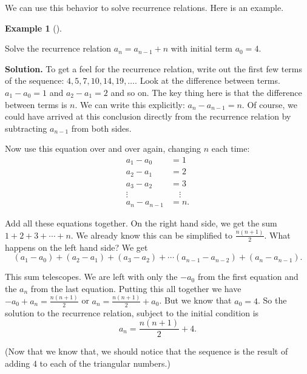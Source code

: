 \documentclass[10pt,]{book}
\theoremstyle{plain}
\theoremstyle{definition}
\newtheorem{example}[theorem]{Example}
\theoremstyle{definition}
\theoremstyle{definition}
\numberwithin{equation}{chapter}
\newcommand{\amp}{ & }
\begin{document}
We can use this behavior to solve recurrence relations. Here is an example.
%
\begin{example}[]\label{example-74}

Solve the recurrence relation \(a_n = a_{n-1} + n\) with initial term \(a_0 = 4\).
%
\par\medskip\noindent%
\textbf{Solution.}\quad
To get a feel for the recurrence relation, write out the first few terms of the sequence: \(4, 5, 7, 10, 14, 19, \ldots\). Look at the difference between terms. \(a_1 - a_0 = 1\) and \(a_2 - a_1 = 2\) and so on. The key thing here is that the difference between terms is \(n\). We can write this explicitly: \(a_n - a_{n-1} = n\). Of course, we could have arrived at this conclusion directly from the recurrence relation by subtracting \(a_{n-1}\) from both sides.
%
\par

Now use this equation over and over again, changing \(n\) each time:
\begin{align*}
  a_1 - a_0 \amp = 1\\
  a_2 - a_1 \amp = 2\\
  a_3 - a_2 \amp  = 3\\
  \vdots \quad \amp  \quad \vdots\\
  a_n - a_{n-1} \amp  = n.
\end{align*}
%
\par

Add all these equations together. On the right hand side, we get the sum \(1 + 2 + 3 + \cdots + n\). We already know this can be simplified to \(\frac{n(n+1)}{2}\). What happens on the left hand side? We get
\begin{equation*}
  (a_1 - a_0) + (a_2 - a_1) + (a_3 - a_2) + \cdots (a_{n-1} - a_{n-2})+ (a_n - a_{n-1}).
\end{equation*}
%
\par

This sum telescopes. We are left with only the \(-a_0\) from the first equation and the \(a_n\) from the last equation. Putting this all together we have \(-a_0 + a_n = \frac{n(n+1)}{2}\) or \(a_n = \frac{n(n+1)}{2} + a_0\). But we know that \(a_0 = 4\). So the solution to the recurrence relation, subject to the initial condition is
\begin{equation*}
  a_n = \frac{n(n+1)}{2} + 4.
\end{equation*}
%
\par

(Now that we know that, we should notice that the sequence is the result of adding 4 to each of the triangular numbers.)
%
\end{example}
\par
\end{document}
